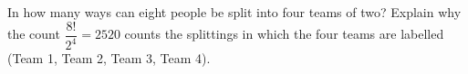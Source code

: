 In how many ways can eight people be split into four teams of two? Explain why the count $\dfrac{8!}{2^4}=2520$ counts the splittings in which the four teams are labelled (Team 1, Team 2, Team 3, Team 4).
